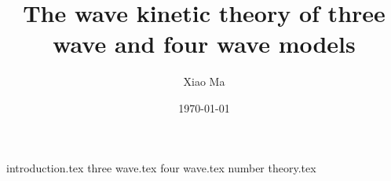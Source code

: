 \documentclass{puthesis-UG}
\title{The wave kinetic theory of three wave and four wave models}
\author{Xiao Ma}
\date{\today}
\theoremstyle{definition}
\theoremstyle{remark}
\numberwithin{equation}{section}
\begin{document}
{introduction.tex}
{three wave.tex}
{four wave.tex}
{number theory.tex}




 

\end{document}
